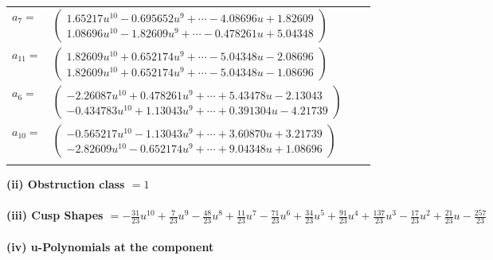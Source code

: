 \documentclass[1p]{elsarticle_modified}
\theoremstyle{definition}
\begin{document}
\begin{tabular}{m{7pt} m{180pt} m{7pt} m{180pt} }
\flushright $a_{7}=$&$\begin{pmatrix}1.65217 u^{10}-0.695652 u^{9}+\cdots-4.08696 u+1.82609\\1.08696 u^{10}-1.82609 u^{9}+\cdots-0.478261 u+5.04348\end{pmatrix}$ \\
\flushright $a_{11}=$&$\begin{pmatrix}1.82609 u^{10}+0.652174 u^{9}+\cdots-5.04348 u-2.08696\\1.82609 u^{10}+0.652174 u^{9}+\cdots-5.04348 u-1.08696\end{pmatrix}$ \\
\flushright $a_{6}=$&$\begin{pmatrix}-2.26087 u^{10}+0.478261 u^{9}+\cdots+5.43478 u-2.13043\\-0.434783 u^{10}+1.13043 u^{9}+\cdots+0.391304 u-4.21739\end{pmatrix}$ \\
\flushright $a_{10}=$&$\begin{pmatrix}-0.565217 u^{10}-1.13043 u^{9}+\cdots+3.60870 u+3.21739\\-2.82609 u^{10}-0.652174 u^{9}+\cdots+9.04348 u+1.08696\end{pmatrix}$\\&\end{tabular}
\flushleft \textbf{(ii) Obstruction class $= 1$}\\~\\
\flushleft \textbf{(iii) Cusp Shapes $= -\frac{31}{23} u^{10}+\frac{7}{23} u^9-\frac{48}{23} u^8+\frac{11}{23} u^7-\frac{71}{23} u^6+\frac{34}{23} u^5+\frac{91}{23} u^4+\frac{137}{23} u^3-\frac{17}{23} u^2+\frac{21}{23} u-\frac{257}{23}$}\\~\\
\newpage\renewcommand{\arraystretch}{1}
\flushleft \textbf{(iv) u-Polynomials at the component}\newline \\
\end{document}
